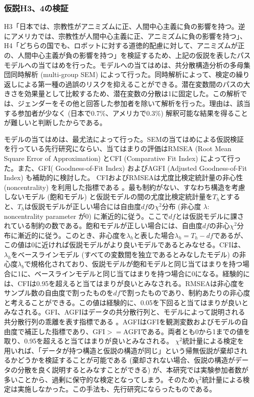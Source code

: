\documentclass[a4j,12pt]{jreport}
\begin{document}
\subsubsection{仮説H3、4の検証}
H3「日本では、宗教性がアニミズムに正、人間中心主義に負の影響を持つ。逆にアメリカでは、宗教性が人間中心主義に正、アニミズムに負の影響を持つ」、H4「どちらの国でも、ロボットに対する道徳的配慮に対して、アニミズムが正の、人間中心主義が負の影響を持つ」を検証するため、上記の仮説を表したパスモデルへの当てはめを行った。モデルへの当てはめは、共分散構造分析の多母集団同時解析 (multi-group SEM) によって行った。同時解析によって、検定の繰り返しによる第一種の過誤のリスクを抑えることができる。潜在変数間のパスの大きさを効果量として比較するため、潜在変数の分散は1に固定した。この解析では、ジェンダーをその他と回答した参加者を除いて解析を行った。理由は、該当する参加者が少なく (日本で0.7\%、アメリカで0.3\%) 解釈可能な結果を得ることが難しいと判断したからである。


モデルの当てはめは、最尤法によって行った。SEMの当てはめによる仮説検証を行っている先行研究\cite{noren}にならい、当てはまりの評価はRMSEA (Root Mean Square Error of Approximation) とCFI (Comparative Fit Index) によって行った。また、GFI( Goodness-of-Fit Index) およびAGFI (Adjusted Goodness-of-Fit Index) も補助的に検討した。
CFIおよびRMSEAは尤度比検定統計量の非心性 (noncentrality) を利用した指標である\cite{hishin} 。最も制約がない、すなわち構造を考慮しないモデル (飽和モデル) と仮説モデルの間の尤度比検定統計量を$T_h$とすると、$T_h$は仮説モデルが正しい場合には自由度$df$の$\chi^2$分布 (非心度 $\lambda$: noncentrality parameter が0) に漸近的に従う。ここで$df$とは仮説モデルに課されている制約の数である。飽和モデルが正しい場合には、自由度$df$の非心$\chi^2$分布に漸近的に従う。このとき、非心度を$\lambda_h$と表した場合$\lambda_h=T_h - df$であるが、この値は0に近ければ仮説モデルがより良いモデルであるとみなせる。CFIは、$\lambda_h$をベースラインモデル (すべての変数間を独立であるとみなしたモデル) の非心度$\lambda_b$で規格化されており、仮説モデルが飽和モデルと同じ当てはまりを持つ場合に1に、ベースラインモデルと同じ当てはまりを持つ場合に0になる。経験的には、CFIは0.95を超えると当てはまりが良いとみなされる。RMSEAは非心度をサンプル数の自由度で割ったものを$df$で割ったものであり、制約あたりの非心度と考えることができる。この値は経験的に、0.05を下回ると当てはまりが良いとみなされる。GFI、AGFIはデータの共分散行列と、モデルによって説明される共分散行列の乖離を表す指標である\cite{hishin} 。AGFIはGFIを観測変数およびモデルの自由度で補正した指標であり、GFI$>=$AGFIである。両者とも0から1までの値を取り、0.95を超えると当てはまりが良いとみなされる。
$\chi ^2$統計量による検定を用いれば、「データが持つ構造と仮説の構造が同じ」という帰無仮説が棄却されるかどうかを検証することが可能である (棄却されない場合、仮説の構造がデータの分散を良く説明するとみなすことができる) が、本研究では実験参加者数が多いことから、過剰に保守的な検定となってしまう。そのため$\chi ^2$統計量による検定は実施しなかった。この手法も、先行研究\cite{noren}にならったものである。
\end{document}
